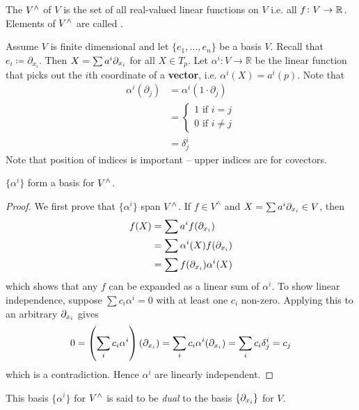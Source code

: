 The  \(V^\wedge\) of \(V\) is the set of all real-valued linear functions on \(V\) i.e. all \(f \colon V \rightarrow \mathbb{R}\).
%
Elements of \(V^\wedge\) are called .

Assume \(V\) is finite dimensional and let \(\{e_1, \dots, e_n\}\) be a basis \(V\).
%
Recall that \(e_i \coloneqq \partial_{x_i}\).
%
Then \(X = \sum a^i \partial_{x_i}\) for all \(X \in T_p\).
%
Let \(\alpha^i \colon V \rightarrow \mathbb{R}\) be the linear function that picks out the \(i\)th coordinate of a \textbf{vector}, i.e. \(\alpha^i(X) = a^i(p)\).
%
Note that
%
\begin{align}
    \alpha^i(\partial_j) & = \alpha^i(1\cdot \partial_j) \\
                         & = \begin{cases}
        1 \text{ if } i = j \\
        0 \text{ if } i \neq j
    \end{cases}  \\
                         & =\delta_j^i
\end{align}
%
Note that position of indices is important -- upper indices are for covectors.
%
\begin{proposition}{}{}
    \(\{\alpha^i\}\) form a basis for \(V^\wedge\).
\end{proposition}
%
\begin{proof}
    We first prove that \(\{\alpha^i\}\) span \(V^\wedge\). If \(f \in V^\wedge\) and \(X = \sum a^i \partial_{x_i} \in V\), then
    \begin{align}
        f(X) & = \sum a^i f(\partial_{x_{i}})          \\
             & = \sum \alpha^i(X) f(\partial_{x_{i}})  \\
             & = \sum f(\partial_{x_{i}}) \alpha^i (X)
    \end{align}
    which shows that any \(f\) can be expanded as a linear sum of \(\alpha^i\).
    To show linear independence, suppose \(\sum c_i \alpha^i = 0\) with at least one \(c_i\) non-zero. Applying this to an arbitrary \(\partial_{x_{i}}\) gives
    \begin{equation}
        0 = \left(\sum_i c_i \alpha^i   \right)(\partial_{x_{i}}) = \sum_i c_i \alpha^i(\partial_{x_{i}}) = \sum_i c_i \delta_j^i = c_j
    \end{equation}
    which is a contradiction. Hence \(\alpha^i\) are linearly independent.
\end{proof}
%
This basis \(\{\alpha^i\}\) for \(V^\wedge\) is said to be \textit{dual} to the basis \(\{\partial_{x_{i}}\}\) for \(V\).
